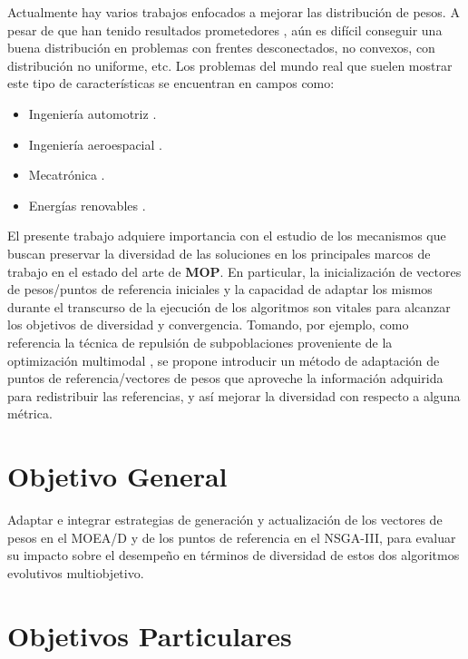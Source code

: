 \documentclass[letterpaper,10pt]{article}
\begin{document}
Actualmente hay varios trabajos enfocados a mejorar las distribución de pesos. A pesar de que han tenido resultados prometedores \cite{4358754,6600851,li2015evolutionary,fang2000uniform}, aún es difícil conseguir una buena distribución en problemas
con frentes desconectados, no convexos, con distribución no uniforme, etc. Los problemas del mundo real que suelen mostrar este tipo de características se encuentran en campos como:

\begin{itemize}
 \item Ingeniería automotriz \cite{6600851,liao2008multiobjective}.
 \item Ingeniería aeroespacial \cite{keskin2006application}.
 \item Mecatrónica \cite{affi2007advanced}.
 \item Energías renovables \cite{you2012optimal}.
\end{itemize}
 
El presente trabajo adquiere importancia con el estudio de los mecanismos que buscan preservar la diversidad de las soluciones en los principales marcos de trabajo en el estado del arte de \textbf{MOP}. En particular,
la inicialización de vectores de pesos/puntos de referencia iniciales y la capacidad de adaptar los mismos durante el transcurso de la ejecución de los algoritmos son vitales para alcanzar los objetivos de diversidad y convergencia. 
Tomando, por ejemplo, como referencia la técnica de repulsión de subpoblaciones proveniente de la optimización multimodal \cite{ahrari2016multimodal}, se propone introducir un método de adaptación de puntos de referencia/vectores de pesos que aproveche la información adquirida para redistribuir las referencias, y así mejorar la diversidad con respecto a alguna métrica.

\section{Objetivo General}

Adaptar e integrar estrategias de generación y actualización de los vectores de pesos en el MOEA/D y de los puntos de referencia en el NSGA-III, para  evaluar su impacto sobre el desempeño en términos de diversidad de estos dos algoritmos evolutivos multiobjetivo.

\section{Objetivos Particulares}
\end{document}
